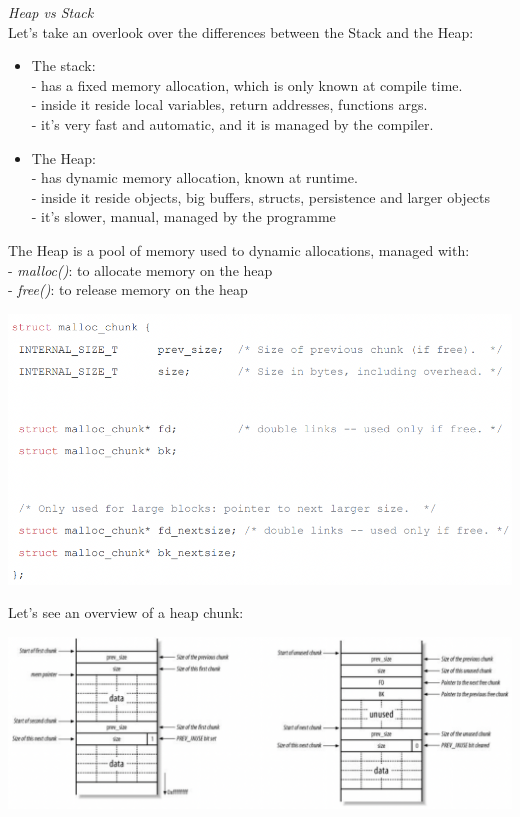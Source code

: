 \documentclass[11pt, oneside]{article}   	%
\begin{document}
\emph{Heap vs Stack}\\
Let's take an overlook over the differences between the Stack and the Heap:
\begin{itemize}
\item The stack:\\
- has a fixed memory allocation, which is only known at compile time.\\
- inside it reside local variables, return addresses, functions args.\\
- it's very fast and automatic, and it is managed by the compiler.
\item The Heap:\\
- has dynamic memory allocation, known at runtime.\\
- inside it reside objects, big buffers, structs, persistence and larger objects\\
- it's slower, manual, managed by the programme
\end{itemize}
The Heap is a pool of memory used to dynamic allocations, managed with:\\
- \emph{malloc()}: to allocate memory on the heap\\
- \emph{free()}: to release memory on the heap\\\begin{center}
\includegraphics[scale = 0.6]{heap}
\end{center}
Let's see an overview of a heap chunk:
\begin{center}
\includegraphics[scale = 0.6]{heap2}
\end{center}
\end{document}

